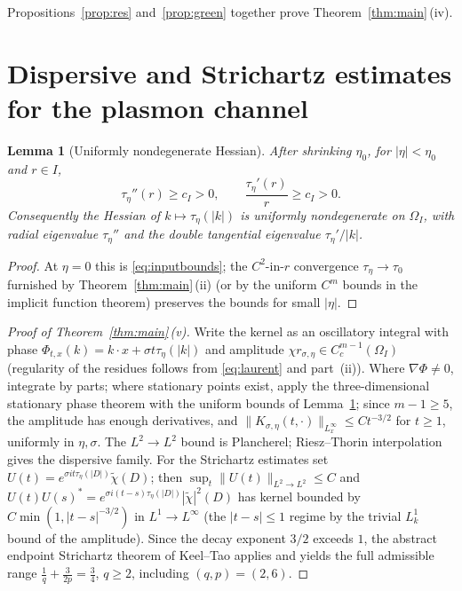 \documentclass[11pt,a4paper]{amsart}
\newtheorem{lemma}[theorem]{Lemma}
\theoremstyle{definition}
\theoremstyle{remark}
\begin{document}
Propositions~\ref{prop:res} and~\ref{prop:green} together prove Theorem~\ref{thm:main}\,(iv).

\section{Dispersive and Strichartz estimates for the plasmon channel}\label{sec:dispersive}

\begin{lemma}[Uniformly nondegenerate Hessian]\label{lem:hessian}
After shrinking $\eta_0$, for $|\eta|<\eta_0$ and $r\in I$,
\begin{equation}\label{eq:hessian}
\tau_\eta''(r)\ge c_I>0,\qquad \frac{\tau_\eta'(r)}{r}\ge c_I>0 .
\end{equation}
Consequently the Hessian of $k\mapsto\tau_\eta(|k|)$ is uniformly nondegenerate on $\Omega_I$, with radial eigenvalue $\tau_\eta''$ and the double tangential eigenvalue $\tau_\eta'/|k|$.
\end{lemma}

\begin{proof}
At $\eta=0$ this is \eqref{eq:inputbounds}; the $C^2$-in-$r$ convergence $\tau_\eta\to\tau_0$ furnished by Theorem~\ref{thm:main}\,(ii) (or by the uniform $C^m$ bounds in the implicit function theorem) preserves the bounds for small $|\eta|$.
\end{proof}

\begin{proof}[Proof of Theorem~\ref{thm:main}\,(v)]
Write the kernel as an oscillatory integral with phase $\Phi_{t,x}(k)=k\cdot x+\sigma t\tau_\eta(|k|)$ and amplitude $\chi r_{\sigma,\eta}\in C_c^{m-1}(\Omega_I)$ (regularity of the residues follows from \eqref{eq:laurent} and part~(ii)). Where $\nabla\Phi\ne0$, integrate by parts; where stationary points exist, apply the three-dimensional stationary phase theorem with the uniform bounds of Lemma~\ref{lem:hessian}; since $m-1\ge5$, the amplitude has enough derivatives, and
$\|K_{\sigma,\eta}(t,\cdot)\|_{L^\infty_x}\le Ct^{-3/2}$ for $t\ge1$, uniformly in $\eta,\sigma$. The $L^2\to L^2$ bound is Plancherel; Riesz--Thorin interpolation gives the dispersive family. For the Strichartz estimates set $U(t)=e^{\sigma it\tau_\eta(|D|)}\widetilde\chi(D)$; then $\sup_t\|U(t)\|_{L^2\to L^2}\le C$ and $U(t)U(s)^*=e^{\sigma i(t-s)\tau_\eta(|D|)}|\widetilde\chi|^2(D)$ has kernel bounded by $C\min(1,|t-s|^{-3/2})$ in $L^1\to L^\infty$ (the $|t-s|\le1$ regime by the trivial $L^1_k$ bound of the amplitude). Since the decay exponent $3/2$ exceeds $1$, the abstract endpoint Strichartz theorem of Keel--Tao \cite{KeelTao} applies and yields the full admissible range $\frac1q+\frac3{2p}=\frac34$, $q\ge2$, including $(q,p)=(2,6)$.
\end{proof}
\end{document}

